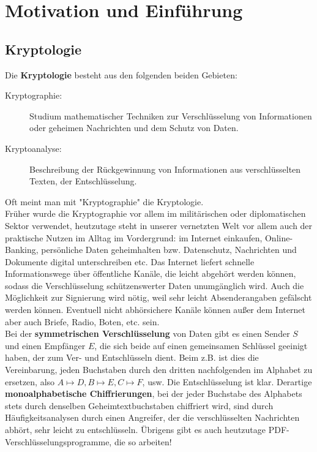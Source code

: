 \setcounter{section}{-1}
\section{Motivation und Einführung}
\label{sec:para0}

\nextlecture
\subsection*{Kryptologie}
	Die \textbf{Kryptologie} besteht aus den folgenden beiden Gebieten: \marginnote{[1]} 
	\begin{description}
		\item[Kryptographie:] Studium mathematischer Techniken zur Verschlüsselung von Informationen oder geheimen Nachrichten und dem Schutz von Daten.
		\item[Kryptoanalyse:] Beschreibung der Rückgewinnung von Informationen aus verschlüsselten Texten, der Entschlüsselung.
	\end{description}
Oft meint man mit "Kryptographie" die Kryptologie. \\

Früher wurde die Kryptographie vor allem im militärischen oder diplomatischen Sektor verwendet, heutzutage steht in unserer vernetzten Welt vor allem auch der praktische Nutzen im Alltag im Vordergrund: im Internet einkaufen, Online-Banking, persönliche Daten geheimhalten bzw. Datenschutz, Nachrichten und Dokumente digital unterschreiben etc. Das Internet liefert schnelle Informationswege über öffentliche Kanäle, die leicht abgehört werden können, sodass die Verschlüsselung schützenswerter Daten unumgänglich wird. Auch die Möglichkeit zur Signierung wird nötig, weil sehr leicht Absenderangaben gefälscht werden können. Eventuell nicht abhörsichere Kanäle können außer dem Internet aber auch Briefe, Radio, Boten, etc. sein. \\

Bei der \textbf{symmetrischen Verschlüsselung} von Daten gibt es einen Sender $S$ und einen Empfänger $E$, die sich beide auf einen gemeinsamen Schlüssel geeinigt haben, der zum Ver- und Entschlüsseln dient. Beim  z.B. ist dies die Vereinbarung, jeden Buchstaben durch den dritten nachfolgenden im Alphabet zu ersetzen, also $A \mapsto D, B \mapsto E, C \mapsto F$, usw. Die Entschlüsselung ist klar. Derartige \textbf{monoalphabetische Chiffrierungen}, bei der jeder Buchstabe des Alphabets stets durch denselben Geheimtextbuchstaben chiffriert wird, sind durch Häufigkeitsanalysen durch einen Angreifer, der die verschlüsselten Nachrichten abhört, sehr leicht zu entschlüsseln. Übrigens gibt es auch heutzutage PDF-Verschlüsselungsprogramme, die so arbeiten! 

